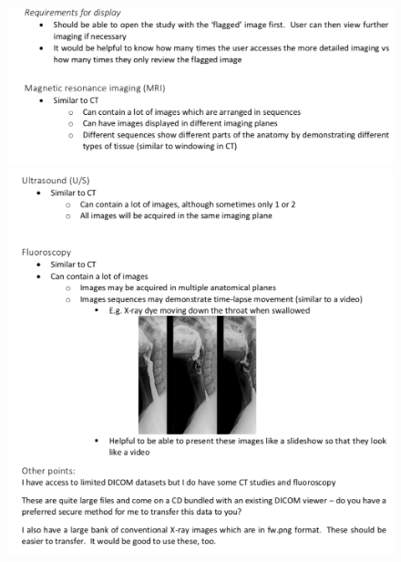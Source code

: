 \documentclass[12pt,twoside]{article}
\begin{document}
\begin{figure}[ht]
\centering
\includegraphics[width = 0.95\hsize]{./figures/ImagingSpec3}
\includegraphics[width = 0.95\hsize]{./figures/ImagingSpec4}
\end{figure}
\clearpage



\printbibliography
\end{document}
